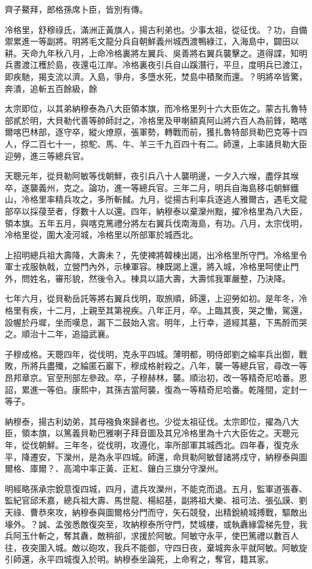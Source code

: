 \begin{pinyinscope}
齊子鰲拜，郎格孫席卜臣，皆別有傳。

冷格里，舒穆祿氏，滿洲正黃旗人，揚古利弟也。少事太祖，從征伐。？功，自備禦累進一等副將。明將毛文龍分兵自朝鮮義州城西渡鴨綠江，入海島中，闢田以耕。天命九年秋八月，上命冷格裏將左翼兵、吳善將右翼兵襲擊之。道得諜，知明兵晝渡江穫於島，夜還屯江岸。冷格裏夜引兵自山蹊潛行，平旦，度明兵已渡江，即疾馳，揭支流以濟。入島，爭舟，多墮水死，焚島中積聚而還。？明將卒皆驚，奔潰，追斬五百餘級，餘

太宗即位，以其弟納穆泰為八大臣領本旗，而冷格里列十六大臣佐之。蒙古扎魯特部貳於明，大貝勒代善等帥師討之，冷格里及甲喇額真阿山將六百人為前鋒，略喀爾喀巴林部，逐守卒，縱火燎原，張軍勢，轉戰而前，獲扎魯特部貝勒巴克等十四人，俘二百七十一，掠駝、馬、牛、羊三千九百四十有二。師還，上率諸貝勒大臣迎勞，進三等總兵官。

天聰元年，從貝勒阿敏等伐朝鮮，夜引兵八十人襲明邊，一夕入六堠，盡俘其堠卒，遂襲義州，克之。論功，進一等總兵官。三年二月，明兵自海島移屯朝鮮鐵山，冷格里率精兵攻之，多所斬馘。九月，從揚古利率兵逐逃人雅爾古，遇毛文龍部卒以採葠至者，俘數十人以還。四年，納穆泰以棄灤州黜，擢冷格里為八大臣，領本旗。五年五月，與喀克篤禮分將左右翼兵伐南海島，有功。八月，太宗伐明，冷格里從，圍大凌河城，冷格里以所部軍於城西北。

上招明總兵祖大壽降，大壽未？，先使裨將韓棟出謁，出冷格里所守門。冷格里令軍士戎服執戟，立營門內外，示棟軍容。棟既謁上還，將入城，冷格里呵使止門外，問姓名，審形貌，然後令入。棟具以語大壽，大壽怵我軍嚴整，乃決降。

七年六月，從貝勒岳託等將右翼兵伐明，取旅順，師還，上迎勞如初。是年冬，冷格里有疾，十二月，上親至其第視疾。八年正月，卒。上臨其喪，哭之慟，駕還，設幄於丹墀，坐而嘆息，漏下二鼓始入宮。明年，上行幸，道經其墓，下馬酹而哭之。順治十二年，追謚武襄。

子穆成格。天聰四年，從伐明，克永平四城。薄明都，明侍郎劉之綸率兵出御，戰敗，所將兵盡殲，之綸匿石巖下，穆成格射殺之。八年，襲一等總兵官，尋改一等昂邦章京。官至刑部左參政。卒，子穆赫林，襲。順治初，改一等精奇尼哈番。恩詔，累進一等伯。康熙中，其孫吉當阿襲，復為一等精奇尼哈番。乾隆間，定封一等子。

納穆泰，揚古利幼弟，其母襁負來歸者也。少從太祖征伐。太宗即位，擢為八大臣，領本旗，以篤義貝勒巴雅喇子拜音圖及其兄冷格里為十六大臣佐之。天聰元年，從伐朝鮮。三年冬，從伐明，攻遵化，率所部軍其城西北。四年春，復克永平，降遷安，下灤州，是為永平四城。師還，命貝勒阿敏督諸將戍守，納穆泰與圖爾格、庫爾？、高鴻中率正黃、正紅、鑲白三旗分守灤州。

明經略孫承宗銳意復四城，四月，遣兵攻灤州，不能克而退。五月，監軍道張春、監紀官邱禾嘉，總兵祖大壽、馬世龍、楊紹基，副將祖大樂、祖可法、張弘謨、劉天祿、曹恭來攻，納穆泰與圖爾格分門而守，矢石競發，出精銳繞城搏戰，驅敵出壕外。？誠、孟弢悉敵復突至，攻納穆泰所守門，焚城樓，或執纛緣雲梯先登，我兵阿玉什斬之，奪其纛，敵稍卻，求援於阿敏。阿敏守永平，使巴篤禮以數百人往，夜突圍入城。敵以砲攻，我兵不能御，守四日夜，棄城奔永平就阿敏。阿敏旋引師還，永平四城復入於明。納穆泰坐論死，上命宥之，奪官，籍其家。


\end{pinyinscope}
